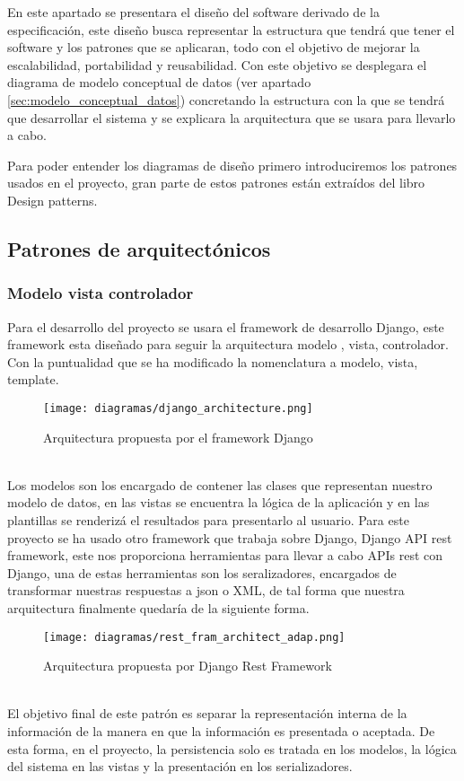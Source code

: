 En este apartado se presentara el diseño del software derivado de la especificación, este diseño busca representar la estructura que tendrá que tener el software y los patrones que se aplicaran, todo con el objetivo de mejorar la escalabilidad, portabilidad y reusabilidad.
Con este objetivo se desplegara el diagrama de modelo conceptual de datos (ver apartado \ref{sec:modelo_conceptual_datos}) concretando la estructura con la que se tendrá que desarrollar el sistema y se explicara la arquitectura que se usara para llevarlo a cabo.


Para poder entender los diagramas de diseño primero introduciremos los patrones usados en el proyecto, gran parte de estos patrones están extraídos del libro Design patterns\cite{vlissides1995design}.

\subsection{Patrones de arquitectónicos}
\subsubsection{Modelo vista controlador}
\label{sec:mvc}
Para el desarrollo del proyecto se usara el framework de desarrollo Django, este framework esta diseñado para seguir la arquitectura modelo , vista, controlador. Con la puntualidad que se ha modificado la nomenclatura a modelo, vista, template.\\
\begin{figure}[ht!]
\center
\texttt{[image: diagramas/django\_architecture.png]}
\caption{Arquitectura propuesta por el framework Django}
\label{fig:django}
\end{figure}
\\
Los modelos son los encargado de contener las clases que representan nuestro modelo de datos, en las vistas se encuentra la lógica de la aplicación y en las plantillas se renderizá el resultados para presentarlo al usuario.
Para este proyecto se ha usado otro framework que trabaja sobre Django, Django API rest framework, este nos proporciona herramientas para llevar a cabo APIs rest con Django, una de estas herramientas son los seralizadores, encargados de transformar nuestras respuestas a json o XML, de tal forma que nuestra arquitectura finalmente quedaría de la siguiente forma.
\\
\begin{figure}[ht!]
\center
\texttt{[image: diagramas/rest\_fram\_architect\_adap.png]}
\caption{Arquitectura propuesta por Django Rest Framework}
\label{fig:rest_framework}
\end{figure}
\\
El objetivo final de este patrón es separar la representación interna de la información de la manera en que la información es presentada o aceptada. De esta forma, en el proyecto, la persistencia solo es tratada en los modelos, la lógica del sistema en las vistas y la presentación en los serializadores.

